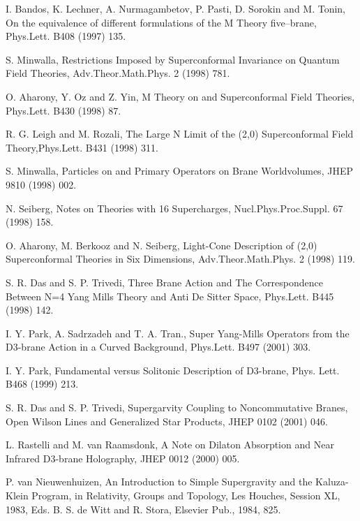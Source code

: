 \documentclass[a4paper,11pt]{article}
\begin{document}
\begin{thebibliography}{99}
I. Bandos, K. Lechner, A. Nurmagambetov, P. Pasti, D. Sorokin and
M. Tonin, On the equivalence of different formulations of the M
Theory five--brane, Phys.Lett. B408 (1997) 135.



S. Minwalla,
Restrictions Imposed by Superconformal Invariance on Quantum Field Theories,
Adv.Theor.Math.Phys. 2 (1998) 781.

O. Aharony, Y. Oz and Z. Yin,
M Theory on \coordHE{} and Superconformal Field Theories,
Phys.Lett. B430 (1998) 87.


R. G. Leigh and M. Rozali, The Large N Limit of the (2,0) Superconformal
Field Theory,Phys.Lett. B431 (1998) 311.


S. Minwalla,
Particles on \coordHE{} and Primary Operators on \coordHE{} Brane Worldvolumes,
JHEP 9810 (1998) 002.


N. Seiberg, Notes on Theories with 16 Supercharges, Nucl.Phys.Proc.Suppl. 67
(1998) 158.


O. Aharony, M. Berkooz and N. Seiberg,
Light-Cone Description of (2,0) Superconformal Theories in Six Dimensions,
Adv.Theor.Math.Phys. 2 (1998) 119.


S. R. Das and S. P. Trivedi, Three Brane Action and The Correspondence Between
N=4 Yang Mills Theory and Anti De Sitter Space, Phys.Lett. B445 (1998) 142.

I. Y. Park, A. Sadrzadeh and  T. A. Tran., Super Yang-Mills Operators from the
D3-brane Action in a Curved Background, Phys.Lett. B497 (2001) 303.

I. Y. Park, Fundamental versus Solitonic Description of D3-brane,
Phys. Lett. B468 (1999) 213.

S. R. Das and S. P. Trivedi, Supergarvity Coupling to
Noncommutative Branes, Open Wilson Lines and Generalized Star
Products, JHEP 0102 (2001) 046.

L. Rastelli and M. van Raamsdonk, A Note on Dilaton Absorption and
Near Infrared D3-brane Holography, JHEP 0012 (2000) 005.



P. van Nieuwenhuizen, An Introduction to Simple Supergravity and the Kaluza-Klein Program,
in Relativity, Groups and Topology, Les Houches, Session XL, 1983, Eds. B. S. de Witt and
R. Stora, Elsevier Pub., 1984, 825.



\end{thebibliography}
\end{document}
